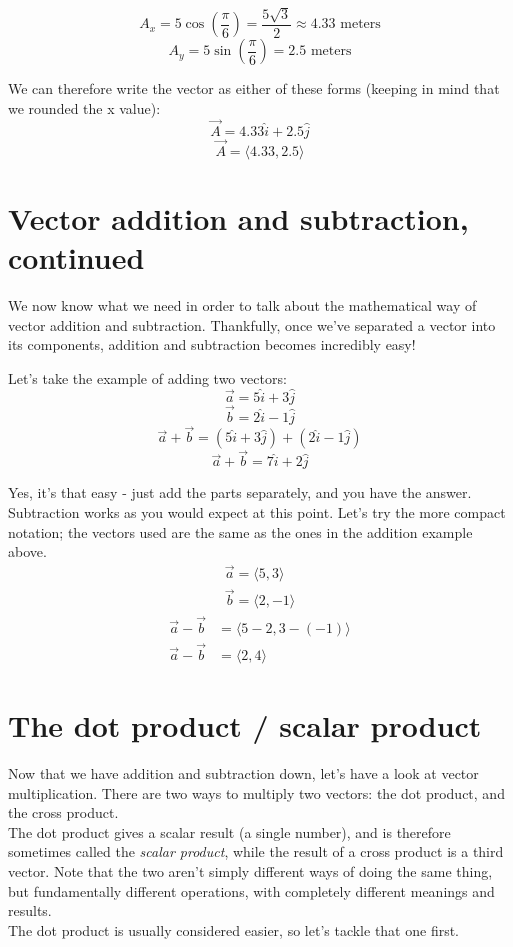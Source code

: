 \documentclass[8.01x]{subfiles}
\begin{document}
\[ A_x = 5 \cos{\left( \frac{\pi}{6}\right) } = \frac{5 \sqrt{3}}{2} \approx 4.33 \text { meters} \]
\[ A_y = 5 \sin{\left( \frac{\pi}{6}\right) } = 2.5 \text { meters} \]

We can therefore write the vector as either of these forms (keeping in mind that we rounded the x value):
\[ \vec{A} = 4.33 \hat{i} + 2.5 \hat{j} \]
\[ \vec{A} = \langle 4.33, 2.5 \rangle \]

\section{Vector addition and subtraction, continued}
We now know what we need in order to talk about the mathematical way of vector addition and subtraction. Thankfully, once we've separated a vector into its components, addition and subtraction becomes incredibly easy!

Let's take the example of adding two vectors:
\[ \vec{a} = 5 \hat{i} + 3 \hat{j} \]
\[ \vec{b} = 2 \hat{i} - 1 \hat{j} \]
\[ \vec{a} + \vec{b} = (5 \hat{i} + 3 \hat{j}) + (2 \hat{i} - 1 \hat{j}) \]
\[ \vec{a} + \vec{b} = 7 \hat{i} + 2 \hat{j} \]

Yes, it's that easy - just add the parts separately, and you have the answer. Subtraction works as you would expect at this point. Let's try the more compact notation; the vectors used are the same as the ones in the addition example above.
\begin{align*}
\vec{a} = \langle 5, 3 \rangle\\
\vec{b} = \langle 2, -1 \rangle
\end{align*}
\begin{align*}
\vec{a} - \vec{b} &= \langle 5 - 2, 3 - (-1) \rangle\\
\vec{a} - \vec{b} &= \langle 2, 4 \rangle
\end{align*}

\section{The dot product / scalar product}
Now that we have addition and subtraction down, let's have a look at vector multiplication. There are two ways to multiply two vectors: the dot product, and the cross product.\\
The dot product gives a scalar result (a single number), and is therefore sometimes called the \emph{scalar product}, while the result of a cross product is a third vector.
Note that the two aren't simply different ways of doing the same thing, but fundamentally different operations, with completely different meanings and results.\\
The dot product is usually considered easier, so let's tackle that one first.
\end{document}
